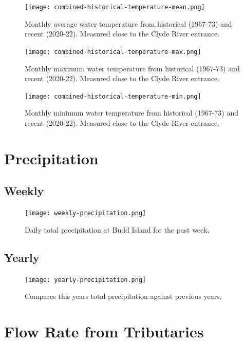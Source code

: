 \documentclass[10pt]{article}
\begin{document}
\begin{figure}[H]
\centering
\texttt{[image: combined-historical-temperature-mean.png]}
\caption[Historical Average Water Temperature]{Monthly average water temperature from historical (1967-73) and recent (2020-22). Measured close to the Clyde River entrance.}
\end{figure}

\begin{figure}[H]
\centering
\texttt{[image: combined-historical-temperature-max.png]}
\caption[Historical Maximum Water Temperature]{Monthly maximum water temperature from historical (1967-73) and recent (2020-22). Measured close to the Clyde River entrance.}
\end{figure}

\begin{figure}[H]
\centering
\texttt{[image: combined-historical-temperature-min.png]}
\caption[Historical Minimum Water Temperature]{Monthly minimum water temperature from historical (1967-73) and recent (2020-22). Measured close to the Clyde River entrance.}
\end{figure}

\section{Precipitation}
\subsection{Weekly}

\begin{figure}[H]
\centering
\texttt{[image: weekly-precipitation.png]}
\caption[Daily Total Precipitation Budd Island]{Daily total precipitation at Budd Island for the past week.}
\end{figure}

\subsection{Yearly}
\begin{figure}[H]
\centering
\texttt{[image: yearly-precipitation.png]}
\caption[Yearly Cumulative Precipitation Budd Island]{Compares this years total precipitation against previous years.}
\end{figure}

\section{Flow Rate from Tributaries}
\end{document}
